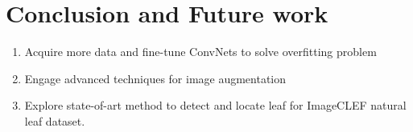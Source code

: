 \documentclass[journal, 10pt]{IEEEtran}
\begin{document}
\section{Conclusion and Future work}
  \begin{enumerate}
    \item Acquire more data and fine-tune ConvNets to solve overfitting problem
    \item Engage advanced techniques for image augmentation
    \item Explore state-of-art method to detect and locate leaf for ImageCLEF natural leaf dataset.
  \end{enumerate}



%


\appendices





\ifCLASSOPTIONcaptionsoff
  \newpage
\fi
\end{document}
